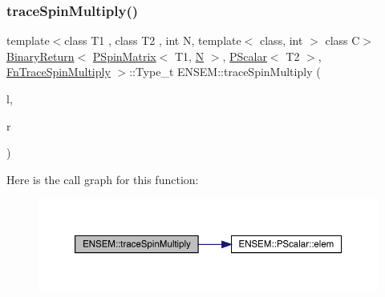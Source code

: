 \subsubsection{\texorpdfstring{traceSpinMultiply()}{traceSpinMultiply()}\hspace{0.1cm}{\footnotesize\ttfamily [2/3]}}
{\footnotesize\ttfamily template$<$class T1 , class T2 , int N, template$<$ class, int $>$ class C$>$ \\
\mbox{\hyperlink{structENSEM_1_1BinaryReturn}{Binary\+Return}}$<$ \mbox{\hyperlink{classENSEM_1_1PSpinMatrix}{P\+Spin\+Matrix}}$<$ T1, \mbox{\hyperlink{adat__devel_2lib_2hadron_2operator__name__util_8cc_a7722c8ecbb62d99aee7ce68b1752f337}{N}} $>$, \mbox{\hyperlink{classENSEM_1_1PScalar}{P\+Scalar}}$<$ T2 $>$, \mbox{\hyperlink{structENSEM_1_1FnTraceSpinMultiply}{Fn\+Trace\+Spin\+Multiply}} $>$\+::Type\+\_\+t E\+N\+S\+E\+M\+::trace\+Spin\+Multiply (\begin{DoxyParamCaption}\item[{const \mbox{\hyperlink{classENSEM_1_1PSpinMatrix}{P\+Spin\+Matrix}}$<$ T1, \mbox{\hyperlink{adat__devel_2lib_2hadron_2operator__name__util_8cc_a7722c8ecbb62d99aee7ce68b1752f337}{N}} $>$ \&}]{l,  }\item[{const \mbox{\hyperlink{classENSEM_1_1PScalar}{P\+Scalar}}$<$ T2 $>$ \&}]{r }\end{DoxyParamCaption})\hspace{0.3cm}{\ttfamily [inline]}}

Here is the call graph for this function\+:\nopagebreak
\begin{figure}[H]
\begin{center}
\leavevmode
\includegraphics[width=350pt]{d6/df5/group__primspinmatrix_ga397616dd6ad517f1cf893903cd93c2c8_cgraph}
\end{center}
\end{figure}
\mbox{\label{group__primspinmatrix_ga2dc2ab87ff63abab3c74a0a1f1dd3d09}} 
